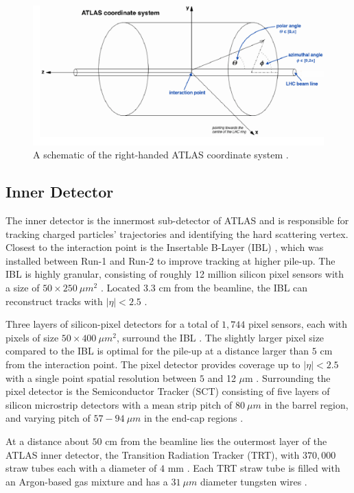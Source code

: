 \begin{figure}[!htb]
    \centering
    \includegraphics[width=.98\linewidth]{figures/LHC/ATLAS_CoordinateSys.png}
    \caption{ A schematic of the right-handed ATLAS coordinate system \cite{ATLAS_CoordSys}.\label{fig:ATLAS_CS}}
\end{figure}

\subsection{Inner Detector}
\label{subsec:ID}
The inner detector is the innermost sub-detector of ATLAS and is responsible for tracking charged particles' trajectories and identifying the hard scattering vertex. Closest to the interaction point is the Insertable B-Layer (IBL) \cite{ATLAS_IBL}, which was installed between Run-1 and Run-2 to improve tracking at higher pile-up. The IBL is highly granular, consisting of roughly 12 million silicon pixel sensors with a size of $50\times 250 ~\mu m^2$ \cite{ATLAS_IBL}. Located $3.3$ cm from the beamline, the IBL can reconstruct tracks with $|\eta|<2.5$ \cite{ATLAS_IBL}. 

Three layers of silicon-pixel detectors for a total of $1,744$ pixel sensors, each with pixels of size $50\times 400 ~\mu m^2$, surround the IBL \cite{ID_Pixel}. The slightly larger pixel size compared to the IBL is optimal for the pile-up at a distance larger than $5$ cm from the interaction point. The pixel detector provides coverage up to $|\eta|<2.5$ with a single point spatial resolution between $5$ and 12 $\mu$m \cite{ID_Pixel}. Surrounding the pixel detector is the Semiconductor Tracker (SCT) consisting of five layers of silicon microstrip detectors with a mean strip pitch of $80 ~\mu m$ in the barrel region, and varying pitch of  $57-94 ~\mu m$ in the end-cap regions \cite{ID_Strips}. 

At a distance about $50$ cm from the beamline lies the outermost layer of the ATLAS inner detector, the Transition Radiation Tracker (TRT), with $370,000$ straw tubes each with a diameter of $4$ mm \cite{ID_TRT}. Each TRT straw tube is filled with an Argon-based gas mixture and has a $31~\mu m$ diameter tungsten wires \cite{ID_TRT}. 

